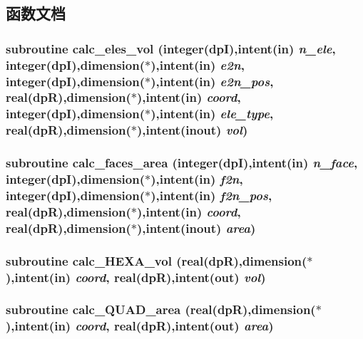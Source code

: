 \subsection{函数文档}
\hypertarget{test_8f90_ab0feb0b96896d0783a452ceb0884de54}{
\subsubsection[{calc\_\-eles\_\-vol}]{\setlength{\rightskip}{0pt plus 5cm}subroutine calc\_\-eles\_\-vol (integer(dpI),intent(in) {\em n\_\-ele}, \/  integer(dpI),dimension($\ast$),intent(in) {\em e2n}, \/  integer(dpI),dimension($\ast$),intent(in) {\em e2n\_\-pos}, \/  real(dpR),dimension($\ast$),intent(in) {\em coord}, \/  integer(dpI),dimension($\ast$),intent(in) {\em ele\_\-type}, \/  real(dpR),dimension($\ast$),intent(inout) {\em vol})}}
\label{test_8f90_ab0feb0b96896d0783a452ceb0884de54}
\hypertarget{test_8f90_a65b36ff25ffa106dab5c6b52332982e1}{
\subsubsection[{calc\_\-faces\_\-area}]{\setlength{\rightskip}{0pt plus 5cm}subroutine calc\_\-faces\_\-area (integer(dpI),intent(in) {\em n\_\-face}, \/  integer(dpI),dimension($\ast$),intent(in) {\em f2n}, \/  integer(dpI),dimension($\ast$),intent(in) {\em f2n\_\-pos}, \/  real(dpR),dimension($\ast$),intent(in) {\em coord}, \/  real(dpR),dimension($\ast$),intent(inout) {\em area})}}
\label{test_8f90_a65b36ff25ffa106dab5c6b52332982e1}
\hypertarget{test_8f90_aedcabc3101935ffa79dac989cdf8cf09}{
\subsubsection[{calc\_\-HEXA\_\-vol}]{\setlength{\rightskip}{0pt plus 5cm}subroutine calc\_\-HEXA\_\-vol (real(dpR),dimension($\ast$),intent(in) {\em coord}, \/  real(dpR),intent(out) {\em vol})}}
\label{test_8f90_aedcabc3101935ffa79dac989cdf8cf09}
\hypertarget{test_8f90_a638fb93022b93255d8000bacff09a674}{
\subsubsection[{calc\_\-QUAD\_\-area}]{\setlength{\rightskip}{0pt plus 5cm}subroutine calc\_\-QUAD\_\-area (real(dpR),dimension($\ast$),intent(in) {\em coord}, \/  real(dpR),intent(out) {\em area})}}
